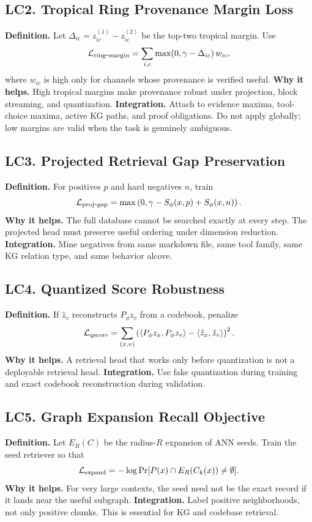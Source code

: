 \documentclass[11pt]{article}
\newcommand{\loss}{\mathcal{L}}
\numberwithin{equation}{section}
\begin{document}
\subsection{LC2. Tropical Ring Provenance Margin Loss}
\textbf{Definition.} Let $\Delta_{ic}=z^{(1)}_{ic}-z^{(2)}_{ic}$ be the top-two tropical margin. Use
\begin{equation}
\loss_{\rm ring\mbox{-}margin}=\sum_{i,c}\max(0,\gamma-\Delta_{ic})\,w_{ic},
\end{equation}
where $w_{ic}$ is high only for channels whose provenance is verified useful. \textbf{Why it helps.} High tropical margins make provenance robust under projection, block streaming, and quantization. \textbf{Integration.} Attach to evidence maxima, tool-choice maxima, active KG paths, and proof obligations. Do not apply globally; low margins are valid when the task is genuinely ambiguous.

\subsection{LC3. Projected Retrieval Gap Preservation}
\textbf{Definition.} For positives $p$ and hard negatives $n$, train
\begin{equation}
\loss_{\rm proj\mbox{-}gap}=\max\left(0,\gamma-S_\phi(x,p)+S_\phi(x,n)\right).
\end{equation}
\textbf{Why it helps.} The full database cannot be searched exactly at every step. The projected head must preserve useful ordering under dimension reduction. \textbf{Integration.} Mine negatives from same markdown file, same tool family, same KG relation type, and same behavior alcove.

\subsection{LC4. Quantized Score Robustness}
\textbf{Definition.} If $\hat z_v$ reconstructs $P_\phi z_v$ from a codebook, penalize
\begin{equation}
\loss_{\rm qscore}=\sum_{(x,v)}\left(\langle P_\phi z_x,P_\phi z_v\rangle-\langle \hat z_x,\hat z_v\rangle\right)^2.
\end{equation}
\textbf{Why it helps.} A retrieval head that works only before quantization is not a deployable retrieval head. \textbf{Integration.} Use fake quantization during training and exact codebook reconstruction during validation.

\subsection{LC5. Graph Expansion Recall Objective}
\textbf{Definition.} Let $E_R(C)$ be the radius-$R$ expansion of ANN seeds. Train the seed retriever so that
\begin{equation}
\loss_{\rm expand}= -\log \Pr[P(x)\cap E_R(C_k(x))\ne\emptyset].
\end{equation}
\textbf{Why it helps.} For very large contexts, the seed need not be the exact record if it lands near the useful subgraph. \textbf{Integration.} Label positive neighborhoods, not only positive chunks. This is essential for KG and codebase retrieval.
\end{document}
